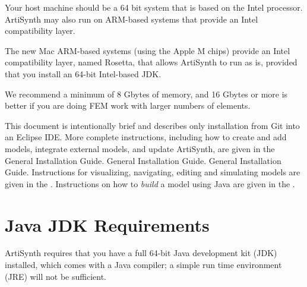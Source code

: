 Your host machine should be a 64 bit system that is based on the Intel
processor. ArtiSynth may also run on ARM-based systems that provide an
Intel compatibility layer.
%
\ifMacOS
\begin{sideblock}
The new Mac ARM-based systems (using the Apple M chips) provide an
Intel compatibility layer, named Rosetta, that allows ArtiSynth to run
as is, provided that you install an 64-bit Intel-based JDK.
\end{sideblock}
\fi
%
We recommend a minimum of 8 Gbytes of memory, and 16 Gbytes or more is
better if you are doing FEM work with larger numbers of elements.


This document is intentionally brief and describes only installation
from Git into an Eclipse IDE. More complete instructions,
including how to create and add models, integrate external
models, and update ArtiSynth, are given in the
\ifLinux
{}%
{General Installation Guide}.
\fi
\ifWindows
{}%
{General Installation Guide}.
\fi
\ifMacOS
{}%
{General Installation Guide}.
\fi
Instructions for visualizing, navigating, editing
and simulating models are given in the 
.
Instructions on how to {\it build} a model using Java are given in
the .

\section{Java JDK Requirements}
\label{InstallingJava:sec}

ArtiSynth requires that you have a full 64-bit Java development kit
(JDK) installed, which comes with a Java compiler; a simple run time
environment (JRE) will not be sufficient.  

